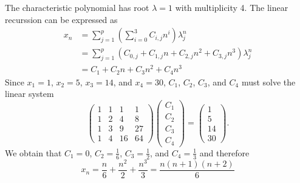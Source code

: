 The characteristic polynomial has root $ \lambda = 1 $ with multiplicity 4.
The linear recurssion can be expressed as
\begin{align*}
    x_n &= \sum_{j=1}^{p} \left( \sum_{i=0}^{3} C_{i,j} n^i \right) \lambda_j^n \\
        &= \sum_{j=1}^{p} \left( C_{0,j} + C_{1,j} n + C_{2,j} n^2 + C_{3,j} n^3 \right) \lambda_j^n \\
        &= C_1 + C_2 n + C_3 n^2 + C_4 n^3
\end{align*}
Since $ x_1 = 1 $, $ x_2 = 5 $, $ x_3 = 14 $, and $ x_4 = 30 $, $ C_1 $, $ C_2 $, $ C_3 $, and $ C_4 $ must solve the linear system
\begin{equation*}
    \begin{pmatrix}
        1 & 1 & 1 & 1 \\
        1 & 2 & 4 & 8 \\
        1 & 3 & 9 & 27 \\
        1 & 4 & 16 & 64
    \end{pmatrix}
    \begin{pmatrix}
        C_1 \\
        C_2 \\
        C_3 \\
        C_4
    \end{pmatrix}
    =
    \begin{pmatrix}
        1 \\
        5 \\
        14 \\
        30
    \end{pmatrix}.
\end{equation*}
We obtain that $ C_1 = 0 $, $ C_2 = \frac{1}{6} $, $ C_3 = \frac{1}{2} $, and $ C_4 = \frac{1}{3} $ and therefore
\begin{equation*}
    x_n = \frac{n}{6} + \frac{n^2}{2} + \frac{n^3}{3} = \frac{n (n + 1) (n + 2)}{6}
\end{equation*}
